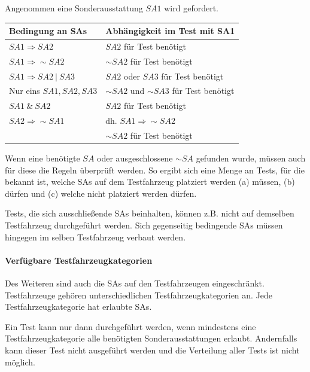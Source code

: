 Angenommen eine Sonderausstattung $SA1$ wird gefordert.

\begin{table}[H]
    \label{tab:tableSAs}
    \begin{tabularx}{\textwidth}{ | l | X |}
        Bedingung an SAs & Abhängigkeit im Test mit SA1 \\\hline\hline
        $SA1 \Rightarrow SA2$ & $SA2$ für Test benötigt \\\hline
        $SA1 \Rightarrow \sim SA2$ & $\sim SA2$  für Test benötigt \\\hline
        $SA1 \Rightarrow SA2~|~SA3$ & $SA2$ oder $SA3$  für Test benötigt \\\hline
        Nur eins $SA1, SA2, SA3$ & $\sim SA2$ und $\sim SA3$  für Test benötigt \\\hline
        $SA1~\&~SA2$ & $SA2$  für Test benötigt \\\hline
        $SA2 \Rightarrow \sim SA1$ & dh. $SA1 \Rightarrow \sim SA2$ \\& $\sim SA2$  für Test benötigt\\\hline
    \end{tabularx}
\end{table}
Wenn eine benötigte $SA$ oder ausgeschlossene $\sim SA$ gefunden wurde,
müssen auch für diese die Regeln überprüft werden. So ergibt sich eine Menge
an Tests, für die bekannt ist, welche SAs auf dem Testfahrzeug platziert werden
(a) müssen, (b) dürfen und (c) welche nicht platziert werden dürfen.

Tests, die sich ausschließende SAs beinhalten, können z.B. nicht auf demselben
Testfahrzeug durchgeführt werden. Sich gegenseitig bedingende SAs müssen
hingegen im selben Testfahrzeug verbaut werden.

\paragraph{Verfügbare Testfahrzeugkategorien}
Des Weiteren sind auch die SAs auf den Testfahrzeugen eingeschränkt.
Testfahrzeuge gehören unterschiedlichen Testfahrzeugkategorien an.
Jede Testfahrzeugkategorie hat erlaubte SAs.

Ein Test kann nur dann durchgeführt werden, wenn mindestens eine
Testfahrzeugkategorie alle benötigten Sonderausstattungen erlaubt.
Andernfalls kann dieser Test nicht ausgeführt werden und die Verteilung
aller Tests ist nicht möglich.

